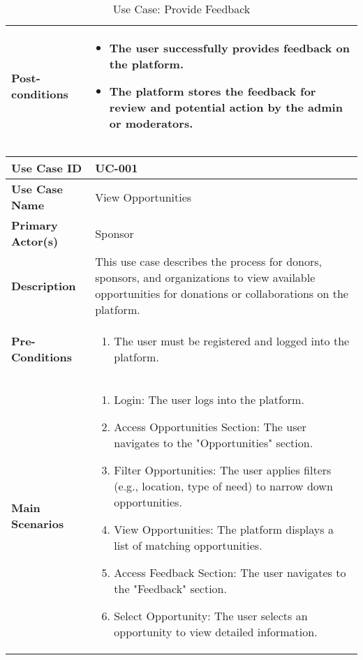 \begin{table}[!ht]
\begin{tabularx}{\textwidth}{|l|X|}
        \hline
        \textbf{Post-conditions} & 
        \begin{itemize}[label=--,itemsep=0pt]
            \item The user successfully provides feedback on the platform.
            \item The platform stores the feedback for review and potential action by the admin or moderators.
        \end{itemize} \\
        \hline
    \end{tabularx}
    \caption{Use Case: Provide Feedback}
    \label{tab:use-case-register}
\end{table}

\begin{table}[!ht]
    \centering
    \renewcommand{\arraystretch}{1.3} %
    \begin{tabularx}{\textwidth}{|l|X|}
        \hline
        \textbf{Use Case ID} & UC-001 \\
        \hline
        \textbf{Use Case Name} & View Opportunities \\
        \hline
        \textbf{Primary Actor(s)} & Sponsor \\
        \hline
        \textbf{Description} &  This use case describes the process for donors, sponsors, and organizations to view available opportunities for donations or collaborations on the platform.\\
        \hline
        \textbf{Pre-Conditions} & 
        \begin{enumerate}[label=\arabic*.,itemsep=0pt]
            \item The user must be registered and logged into the platform.
        \end{enumerate} \\
        \hline
        \textbf{Main Scenarios} & 
        \begin{enumerate}[label=\arabic*.,itemsep=0pt]
            \item Login: The user logs into the platform.
            \item Access Opportunities Section: The user navigates to the "Opportunities" section.
            \item Filter Opportunities: The user applies filters (e.g., location, type of need) to narrow down opportunities.
            \item View Opportunities: The platform displays a list of matching opportunities.
            \item Access Feedback Section: The user navigates to the "Feedback" section.
            \item Select Opportunity: The user selects an opportunity to view detailed information.
        \end{enumerate} \\
        

\end{tabularx}
\end{table}
